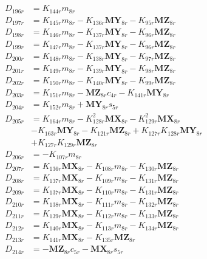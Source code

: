\begin{align}
 \nonumber \\ 
D_{196r} &= K_{144r}m_{8r} \nonumber \\
D_{197r} &= K_{145r}m_{8r} - K_{136r}\mathbf{MY}_{8r} - K_{95r}\mathbf{MZ}_{8r} \nonumber \\
D_{198r} &= K_{146r}m_{8r} - K_{137r}\mathbf{MY}_{8r} - K_{96r}\mathbf{MZ}_{8r} \nonumber \\
D_{199r} &= K_{147r}m_{8r} - K_{137r}\mathbf{MY}_{8r} - K_{96r}\mathbf{MZ}_{8r} \nonumber \\
D_{200r} &= K_{148r}m_{8r} - K_{138r}\mathbf{MY}_{8r} - K_{97r}\mathbf{MZ}_{8r} \nonumber \\
D_{201r} &= K_{149r}m_{8r} - K_{139r}\mathbf{MY}_{8r} - K_{98r}\mathbf{MZ}_{8r} \nonumber \\
D_{202r} &= K_{150r}m_{8r} - K_{140r}\mathbf{MY}_{8r} - K_{99r}\mathbf{MZ}_{8r} \nonumber \\
D_{203r} &= K_{151r}m_{8r} - \mathbf{MZ}_{8r}c_{4r} - K_{141r}\mathbf{MY}_{8r} \nonumber \\
D_{204r} &= K_{152r}m_{8r} + \mathbf{MY}_{8r}s_{5r} \nonumber \\
D_{205r} &= K_{164r}m_{8r} - K_{128r}^2\mathbf{MX}_{8r} - K_{129r}^2\mathbf{MX}_{8r}  \nonumber \\
&- K_{163r}\mathbf{MY}_{8r} - K_{121r}\mathbf{MZ}_{8r} + K_{127r}K_{128r}\mathbf{MY}_{8r}  \nonumber \\
&+ K_{127r}K_{129r}\mathbf{MZ}_{8r} \nonumber \\
D_{206r} &= -K_{107r}m_{8r} \nonumber \\
D_{207r} &= K_{136r}\mathbf{MX}_{8r} - K_{108r}m_{8r} - K_{130r}\mathbf{MZ}_{8r} \nonumber \\
D_{208r} &= K_{137r}\mathbf{MX}_{8r} - K_{109r}m_{8r} - K_{131r}\mathbf{MZ}_{8r} \nonumber \\
D_{209r} &= K_{137r}\mathbf{MX}_{8r} - K_{110r}m_{8r} - K_{131r}\mathbf{MZ}_{8r} \nonumber \\
D_{210r} &= K_{138r}\mathbf{MX}_{8r} - K_{111r}m_{8r} - K_{132r}\mathbf{MZ}_{8r} \nonumber \\
D_{211r} &= K_{139r}\mathbf{MX}_{8r} - K_{112r}m_{8r} - K_{133r}\mathbf{MZ}_{8r} \nonumber \\
D_{212r} &= K_{140r}\mathbf{MX}_{8r} - K_{113r}m_{8r} - K_{134r}\mathbf{MZ}_{8r} \nonumber \\
D_{213r} &= K_{141r}\mathbf{MX}_{8r} - K_{135r}\mathbf{MZ}_{8r} \nonumber \\
D_{214r} &= - \mathbf{MZ}_{8r}c_{5r} - \mathbf{MX}_{8r}s_{5r} \nonumber \\

\end{align}
